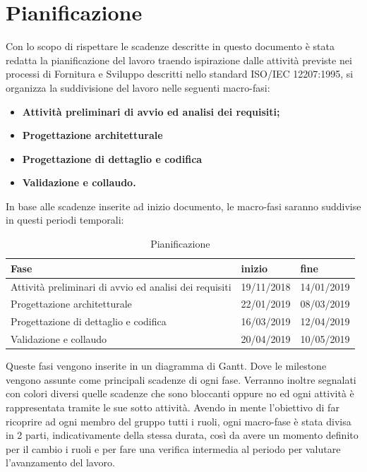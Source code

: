 \section{Pianificazione}

Con lo scopo di rispettare le scadenze descritte in questo documento è stata redatta la pianificazione del lavoro traendo ispirazione dalle attività previste nei processi di Fornitura e Sviluppo descritti nello standard ISO/IEC 12207:1995, si organizza la suddivisione del lavoro nelle seguenti macro-fasi:
\begin{itemize}
	\item{\textbf{Attività preliminari di avvio ed analisi dei requisiti;}}
	\item{\textbf{Progettazione architetturale}}
	\item{\textbf{Progettazione di dettaglio e codifica}}
	\item{\textbf{Validazione e collaudo.}}
\end{itemize} 
In base alle scadenze inserite ad inizio documento, le macro-fasi saranno suddivise in questi periodi temporali:
\newline
\begin{table}[h!]
	\centering
	\begin{tabular}{|l|l|l|}
		\hline
		\textbf{Fase} & \textbf{inizio} & \textbf{fine}\\
		\hline
		Attività preliminari di avvio ed analisi dei requisiti & 19/11/2018 & 14/01/2019 \\
		\hline
		Progettazione architetturale & 22/01/2019 & 08/03/2019\\
		\hline
		Progettazione di dettaglio e codifica & 16/03/2019 & 12/04/2019\\
		\hline
		Validazione e collaudo & 20/04/2019 & 10/05/2019\\
		\hline
	\end{tabular}
	\caption{Pianificazione}
\end{table}

Queste fasi vengono inserite in un diagramma di Gantt. Dove le milestone vengono assunte come principali scadenze di ogni fase. Verranno inoltre segnalati con colori diversi quelle scadenze che sono bloccanti oppure no ed  ogni attività è rappresentata tramite le sue sotto attività.
\newline Avendo in mente l'obiettivo di far ricoprire ad ogni membro del gruppo tutti i ruoli, ogni macro-fase è stata divisa in 2 parti, indicativamente della stessa durata, così da avere un momento definito per il cambio i ruoli e per fare una verifica intermedia al periodo per valutare l'avanzamento del lavoro. 

